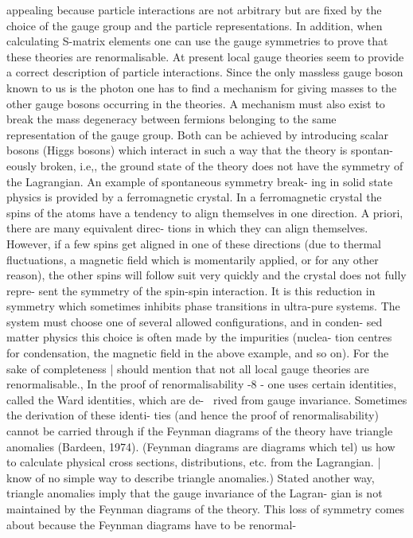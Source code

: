\documentclass[twoside]{article}
\begin{document}
appealing because particle interactions are not arbitrary but are fixed by the
choice of the gauge group and the particle representations. In addition,
when calculating S-matrix elements one can use the gauge symmetries to
prove that these theories are renormalisable. At present local gauge
theories seem to provide a correct description of particle interactions.
Since the only massless gauge boson known to us is the photon one has
to find a mechanism for giving masses to the other gauge bosons
occurring in the theories. A mechanism must also exist to break the
mass degeneracy between fermions belonging to the same representation
of the gauge group. Both can be achieved by introducing scalar bosons
(Higgs bosons) which interact in such a way that the theory is spontan-
eously broken, i.e,, the ground state of the theory does not have the
symmetry of the Lagrangian. An example of spontaneous symmetry break-
ing in solid state physics is provided by a ferromagnetic crystal. In a
ferromagnetic crystal the spins of the atoms have a tendency to align
themselves in one direction. A priori, there are many equivalent direc-
tions in which they can align themselves. However, if a few spins get
aligned in one of these directions (due to thermal fluctuations, a magnetic
field which is momentarily applied, or for any other reason), the other
spins will follow suit very quickly and the crystal does not fully repre-
sent the symmetry of the spin-spin interaction. It is this reduction in
symmetry which sometimes inhibits phase transitions in ultra-pure systems.
The system must choose one of several allowed configurations, and in conden-
sed matter physics this choice is often made by the impurities (nuclea-
tion centres for condensation, the magnetic field in the above example,
and so on).
For the sake of completeness | should mention that not all local
gauge theories are renormalisable., In the proof of renormalisability
-8 -
one uses certain identities, called the Ward identities, which are de-~
rived from gauge invariance. Sometimes the derivation of these identi-
ties (and hence the proof of renormalisability) cannot be carried through
if the Feynman diagrams of the theory have triangle anomalies (Bardeen,
1974). (Feynman diagrams are diagrams which tel) us how to calculate
physical cross sections, distributions, etc. from the Lagrangian. |
know of no simple way to describe triangle anomalies.) Stated another
way, triangle anomalies imply that the gauge invariance of the Lagran-
gian is not maintained by the Feynman diagrams of the theory. This loss
of symmetry comes about because the Feynman diagrams have to be renormal-
\end{document}

